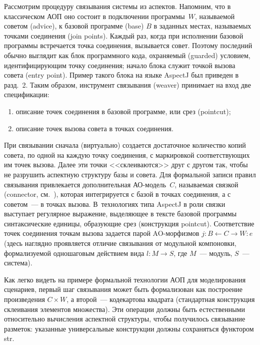 \begin{multicols}{2}
\smallskip
   
   Рассмотрим процедуру связывания системы из аспектов. Напомним, что в 
классическом АОП оно состоит в подключении программы~$W$, называемой 
советом (advice), к базовой программе (base) $B$ в заданных местах, 
называемых точками соединения (join points). Каждый раз, когда при 
исполнении базовой программы встречается точка соединения, вызывается 
совет. Поэтому последний обычно выглядит как блок программного кода, 
охраняемый (guarded) условием, идентифицирующим точку соединения; начало 
блока служит точкой вызова совета (entry point). Пример такого блока на языке 
AspectJ был приведен в разд.~2. Таким образом, инструмент связывания 
(weaver) принимает на вход две спецификации:
   \begin{enumerate}[(1)]
\item описание точек соединения в базовой программе, или срез (pointcut);
\item описание точек вызова совета в точках соединения.
\end{enumerate}

   При связывании сначала (виртуально) создается достаточное количество 
копий совета, по одной на каждую точку соединения, с маркировкой 
соответствующих им точек вызова. Далее эти точки <<склеиваются>> друг с 
другом так, чтобы не разрушить аспектную структуру базы и совета. Для 
формальной записи правил связывания привлекается дополнительная 
   АО-мо\-дель~$C$, называемая связкой (connector, см.~\cite{23-kov}), которая 
интегрируется с базой в точках соединения, а с советом~--- в точках вызова. 
В~технологиях типа AspectJ в роли связки выступает регулярное выражение, 
выделяющее в тексте базовой программы синтаксические единицы, 
образующие срез (конструкция pointcut). Соответствие точек соединения 
точкам вызова задается парой AO-мор\-физ\-мов $j : B \leftarrow C\rightarrow 
W : e$ (здесь наглядно проявляется отличие связывания от модульной 
компоновки, формализуемой одношаговым действием вида $l : M \rightarrow 
S$, где $M$~--- модуль, $S$~--- сис\-те\-ма). 

Как легко видеть на примере 
формальной технологии АОП для моделирования сценариев, первый шаг 
связывания может быть формализован как построение произведения $C\times 
W$, а второй~--- кодекартова квадрата (стандартная конструкция склеивания 
элементов множества). Эти операции должны быть естественными 
относительно вы\-чис\-ле\-ния аспектной структуры, чтобы получилось связывание 
разметок: указанные универсальные конструкции должны сохраняться 
функтором str. 


\end{multicols}
